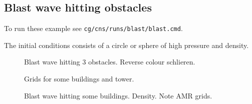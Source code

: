 \subsection{Blast wave hitting obstacles}\label{sec:blastObstacles}

To run these example see {\tt cg/cns/runs/blast/blast.cmd}.

The initial conditions consists of a circle or sphere of high pressure and density.

{
\begin{figure}[htb]
\begin{center}
\end{center}
  \caption{Blast wave hitting 3 obstacles. Reverse colour schlieren.}
  \label{fig:blastShapes}
\end{figure}
}

{
\begin{figure}[htb]
\begin{center}
\end{center}
  \caption{Grids for some buildings and tower.}
  \label{fig:eightBuildings}
\end{figure}
}

{
\begin{figure}[htb]
\begin{center}
\end{center}
  \caption{Blast wave hitting some buildings. Density. Note AMR grids.
  }
  \label{fig:blastBuildings}
\end{figure}
}

